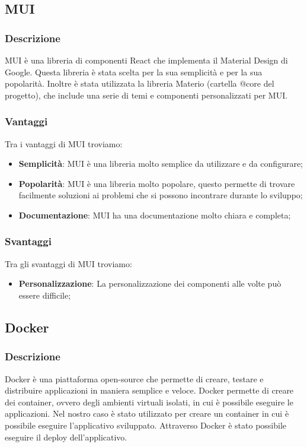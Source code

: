 \subsection*{MUI}

\subsubsection*{Descrizione}
MUI è una libreria di componenti React che implementa il Material Design di Google.
Questa libreria è stata scelta per la sua semplicità e per la sua popolarità.
Inoltre è stata utilizzata la libreria Materio (cartella @core del progetto), che include una serie di temi e componenti personalizzati per MUI.

\subsubsection*{Vantaggi}
Tra i vantaggi di MUI troviamo:
\begin{itemize}
    \item \textbf{Semplicità}: MUI è una libreria molto semplice da utilizzare e da configurare;
    \item \textbf{Popolarità}: MUI è una libreria molto popolare, questo permette di trovare facilmente soluzioni ai problemi che si possono incontrare durante lo sviluppo;
    \item \textbf{Documentazione}: MUI ha una documentazione molto chiara e completa;
\end{itemize}

\subsubsection*{Svantaggi}
Tra gli svantaggi di MUI troviamo:
\begin{itemize}
    \item \textbf{Personalizzazione}: La personalizzazione dei componenti alle volte può essere difficile;
\end{itemize}


\subsection*{Docker}

\subsubsection*{Descrizione}
Docker è una piattaforma open-source che permette di creare, testare e distribuire applicazioni in maniera semplice e veloce.
Docker permette di creare dei container, ovvero degli ambienti virtuali isolati, in cui è possibile eseguire le applicazioni. Nel nostro caso 
è stato utilizzato per creare un container in cui è possibile eseguire l'applicativo sviluppato. Attraverso Docker è stato possibile
eseguire il deploy dell'applicativo.

